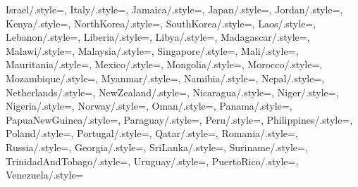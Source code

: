 {  Israel/.style={},
  Italy/.style={},
  Jamaica/.style={},
  Japan/.style={},
  Jordan/.style={},
  Kenya/.style={},
  NorthKorea/.style={},
  SouthKorea/.style={},
  Laos/.style={},
  Lebanon/.style={},
  Liberia/.style={},
  Libya/.style={},
  Madagascar/.style={},
  Malawi/.style={},
  Malaysia/.style={},
  Singapore/.style={},
  Mali/.style={},
  Mauritania/.style={},
  Mexico/.style={},
  Mongolia/.style={},
  Morocco/.style={},
  Mozambique/.style={},
  Myanmar/.style={},
  Namibia/.style={},
  Nepal/.style={},
  Netherlands/.style={},
  NewZealand/.style={},
  Nicaragua/.style={},
  Niger/.style={},
  Nigeria/.style={},
  Norway/.style={},
  Oman/.style={},
  Panama/.style={},
  PapuaNewGuinea/.style={},
  Paraguay/.style={},
  Peru/.style={},
  Philippines/.style={},
  Poland/.style={},
  Portugal/.style={},
  Qatar/.style={},
  Romania/.style={},
  Russia/.style={},
  Georgia/.style={},
  SriLanka/.style={},
  Suriname/.style={},
  TrinidadAndTobago/.style={},
  Uruguay/.style={},
  PuertoRico/.style={},
  Venezuela/.style={}
}

